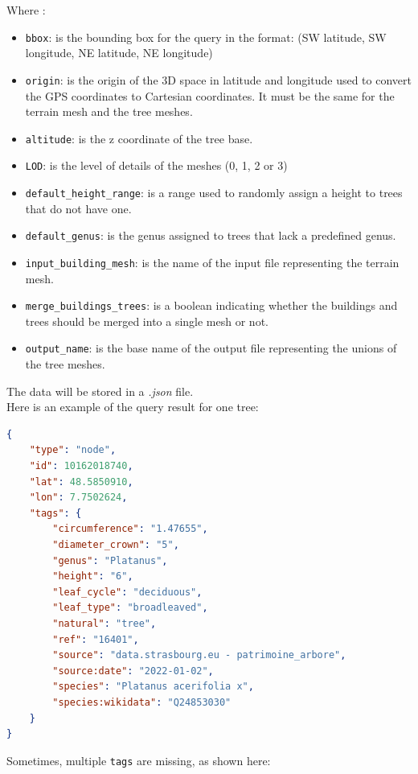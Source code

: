 \documentclass[12pt]{article}
\begin{document}
Where :
\begin{itemize}
    \item \texttt{bbox}: is the bounding box for the query in the format:
    \subitem (SW latitude, SW longitude, NE latitude, NE longitude)
    \item \texttt{origin}: is the origin of the 3D space in latitude and longitude
    used to convert the GPS coordinates to Cartesian coordinates. It must be the
    same for the terrain mesh and the tree meshes.
    \item \texttt{altitude}: is the z coordinate of the tree base.
    \item \texttt{LOD}: is the level of details of the meshes (0, 1, 2 or 3)
    \item \texttt{default\_height\_range}: is a range used to randomly assign a
    height to trees that do not have one.
    \item \texttt{default\_genus}: is the genus assigned to trees that lack a
    predefined genus.
    \item \texttt{input\_building\_mesh}: is the name of the input file
    representing the terrain mesh.
    \item \texttt{merge\_buildings\_trees}: is a boolean indicating whether the
    buildings and trees should be merged into a single mesh or not.
    \item \texttt{output\_name}: is the base name of the output file
    representing the unions of the tree meshes.
\end{itemize}

The data will be stored in a \textit{.json} file. \\
Here is an example of the query result for one tree:

\begin{lstlisting}[language=json]
{
    "type": "node",
    "id": 10162018740,
    "lat": 48.5850910,
    "lon": 7.7502624,
    "tags": {
        "circumference": "1.47655",
        "diameter_crown": "5",
        "genus": "Platanus",
        "height": "6",
        "leaf_cycle": "deciduous",
        "leaf_type": "broadleaved",
        "natural": "tree",
        "ref": "16401",
        "source": "data.strasbourg.eu - patrimoine_arbore",
        "source:date": "2022-01-02",
        "species": "Platanus acerifolia x",
        "species:wikidata": "Q24853030"
    }
}
\end{lstlisting}

Sometimes, multiple \texttt{tags} are missing, as shown here:
\end{document}
